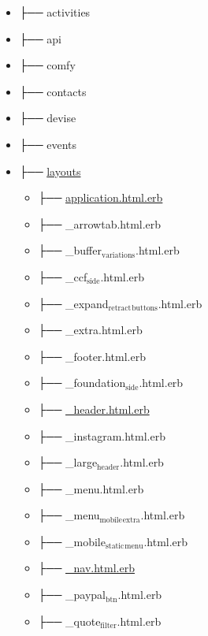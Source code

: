 \documentclass[11pt]{article}
\begin{document}
\begin{itemize}
\item ├── activities
\label{sec-1-1-9-1}
\item ├── api
\label{sec-1-1-9-2}
\item ├── comfy
\label{sec-1-1-9-3}
\item ├── contacts
\label{sec-1-1-9-4}
\item ├── devise
\label{sec-1-1-9-5}
\item ├── events
\label{sec-1-1-9-6}
\item ├── \href{./app/views/layouts}{layouts}
\label{sec-1-1-9-7}

\begin{itemize}
\item ├── \href{./app/views/layouts/application.html.erb}{application.html.erb}
\label{sec-1-1-9-7-1}
\item ├── \_arrowtab.html.erb
\label{sec-1-1-9-7-2}
\item ├── \_buffer$_{\text{variations}}$.html.erb
\label{sec-1-1-9-7-3}
\item ├── \_ccf$_{\text{side}}$.html.erb
\label{sec-1-1-9-7-4}
\item ├── \_expand$_{\text{retract}}$$_{\text{buttons}}$.html.erb
\label{sec-1-1-9-7-5}
\item ├── \_extra.html.erb
\label{sec-1-1-9-7-6}
\item ├── \_footer.html.erb
\label{sec-1-1-9-7-7}
\item ├── \_foundation$_{\text{side}}$.html.erb
\label{sec-1-1-9-7-8}
\item ├── \href{./app/views/layouts/_header.html.erb}{\_header.html.erb}
\label{sec-1-1-9-7-9}
\item ├── \_instagram.html.erb
\label{sec-1-1-9-7-10}
\item ├── \_large$_{\text{header}}$.html.erb
\label{sec-1-1-9-7-11}
\item ├── \_menu.html.erb
\label{sec-1-1-9-7-12}
\item ├── \_menu$_{\text{mobile}}$$_{\text{extra}}$.html.erb
\label{sec-1-1-9-7-13}
\item ├── \_mobile$_{\text{static}}$$_{\text{menu}}$.html.erb
\label{sec-1-1-9-7-14}
\item ├── \href{./app/views/layouts/_nav.html.erb}{\_nav.html.erb}
\label{sec-1-1-9-7-15}
\item ├── \_paypal$_{\text{btn}}$.html.erb
\label{sec-1-1-9-7-16}
\item ├── \_quote$_{\text{filter}}$.html.erb
\label{sec-1-1-9-7-17}
$$
\end{itemize}
\end{itemize}
\end{document}

